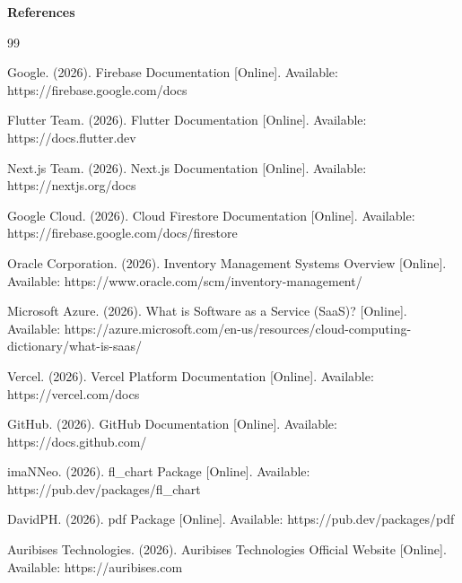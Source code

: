 \documentclass[12pt, oneside]{article}
\begin{document}
\newpage
\begin{center}
    \LARGE \textbf{References}
\end{center}
\vspace{-2.6 em}
\renewcommand{\refname}{}

\begin{thebibliography}{99}

Google. (2026). Firebase Documentation [Online]. Available: https://firebase.google.com/docs

Flutter Team. (2026). Flutter Documentation [Online]. Available: https://docs.flutter.dev

Next.js Team. (2026). Next.js Documentation [Online]. Available: https://nextjs.org/docs

Google Cloud. (2026). Cloud Firestore Documentation [Online]. Available: https://firebase.google.com/docs/firestore

Oracle Corporation. (2026). Inventory Management Systems Overview [Online]. Available: https://www.oracle.com/scm/inventory-management/

Microsoft Azure. (2026). What is Software as a Service (SaaS)? [Online]. Available: https://azure.microsoft.com/en-us/resources/cloud-computing-dictionary/what-is-saas/

Vercel. (2026). Vercel Platform Documentation [Online]. Available: https://vercel.com/docs

GitHub. (2026). GitHub Documentation [Online]. Available: https://docs.github.com/

imaNNeo. (2026). fl\_chart Package [Online]. Available: https://pub.dev/packages/fl\_chart

DavidPH. (2026). pdf Package [Online]. Available: https://pub.dev/packages/pdf

Auribises Technologies. (2026). Auribises Technologies Official Website [Online]. Available: https://auribises.com

\end{thebibliography}
\end{document}
